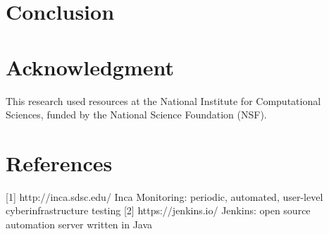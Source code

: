 \documentclass[10pt, conference, compsocconf]{IEEEtran}
\begin{document}
\section{Conclusion}
\label{sec:conclusion}

\section*{Acknowledgment}
This research used resources at the National Institute for Computational Sciences, funded by the National Science Foundation (NSF).

\IEEEtriggercmd{\enlargethispage{-2in}}

\section*{References}
[1] http://inca.sdsc.edu/ Inca Monitoring: periodic, automated, user-level cyberinfrastructure testing
[2] https://jenkins.io/ Jenkins: open source automation server written in Java

%
%
%


%
%
%


\end{document}
